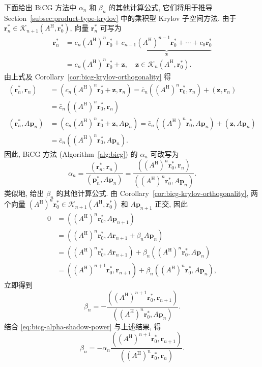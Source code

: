 {下面给出 BiCG 方法中 $\alpha_n$ 和 $\beta_n$ 的其他计算公式, 它们将用于推导 Section\ \ref{subsec:product-type-krylov} 中的乘积型 Krylov 子空间方法.}
{由于 $\bm r_n^{*}\in\mathcal K_{n+1}(A^{\mathrm H},\bm r_0^{*})$, 向量 $\bm r_n^{*}$ 可写为}
\[\begin{aligned}\bm r_n^{*}&=c_n(A^{\mathrm H})^n\bm r_0^{*}+\underbrace{c_{n-1}(A^{\mathrm H})^{n-1}\bm r_0^{*}+\cdots+c_0\bm r_0^{*}}_{\bm z}\\&=c_n(A^{\mathrm H})^n\bm r_0^{*}+\bm z,\quad\bm z\in\mathcal K_n(A^{\mathrm H},\bm r_0^{*}).\end{aligned}\]
{由上式及 Corollary\ \ref{cor:bicg-krylov-orthogonality} 得}
\[\begin{aligned}(\bm r_n^{*},\bm r_n)&=(c_n(A^{\mathrm H})^n\bm r_0^{*}+\bm z,\bm r_n)=\bar c_n((A^{\mathrm H})^n\bm r_0^{*},\bm r_n)+(\bm z,\bm r_n)\\&=\bar c_n((A^{\mathrm H})^n\bm r_0^{*},\bm r_n)\\
(\bm r_n^{*},A\bm p_n)&=(c_n(A^{\mathrm H})^n\bm r_0^{*}+\bm z,A\bm p_n)=\bar c_n((A^{\mathrm H})^n\bm r_0^{*},A\bm p_n)+(\bm z,A\bm p_n)\\&=\bar c_n((A^{\mathrm H})^n\bm r_0^{*},A\bm p_n).
\end{aligned}\]
{因此, BiCG 方法 (Algorithm\ \ref{alg:bicg}) 的 $\alpha_n$ 可改写为}
\begin{equation}\label{eq:bicg-alpha-shadow-power}\alpha_n=\frac{(\bm r_n^{*},\bm r_n)}{(\bm p_n^{*},A\bm p_n)}=\frac{((A^{\mathrm H})^n\bm r_0^{*},\bm r_n)}{((A^{\mathrm H})^n\bm r_0^{*},A\bm p_n)}.\end{equation}
{类似地, 给出 $\beta_n$ 的其他计算公式. 由 Corollary\ \ref{cor:bicg-krylov-orthogonality}, 两个向量 $(A^{\mathrm H})^n\bm r_0^{*}\in\mathcal K_{n+1}(A^{\mathrm H},\bm r_0^{*})$ 和 $A\bm p_{n+1}$ 正交, 因此}
\[\begin{aligned}0&=((A^{\mathrm H})^n\bm r_0^{*},A\bm p_{n+1})\\&=((A^{\mathrm H})^n\bm r_0^{*},A\bm r_{n+1}+\beta_nA\bm p_n)\\&=((A^{\mathrm H})^n\bm r_0^{*},A\bm r_{n+1})+\beta_n((A^{\mathrm H})^n\bm r_0^{*},A\bm p_n)\\&=((A^{\mathrm H})^{n+1}\bm r_0^{*},\bm r_{n+1})+\beta_n((A^{\mathrm H})^n\bm r_0^{*},A\bm p_n),\end{aligned}\]
{立即得到}
\[\beta_n=-\frac{((A^{\mathrm H})^{n+1}\bm r_0^{*},\bm r_{n+1})}{((A^{\mathrm H})^n\bm r_0^{*},A\bm p_n)}.\]
{结合 \eqref{eq:bicg-alpha-shadow-power} 与上述结果, 得}
\begin{equation}\label{eq:bicg-beta-shadow-power}\beta_n=-\alpha_n\frac{((A^{\mathrm H})^{n+1}\bm r_0^{*},\bm r_{n+1})}{((A^{\mathrm H})^n\bm r_0^{*},\bm r_n)}.\end{equation}
